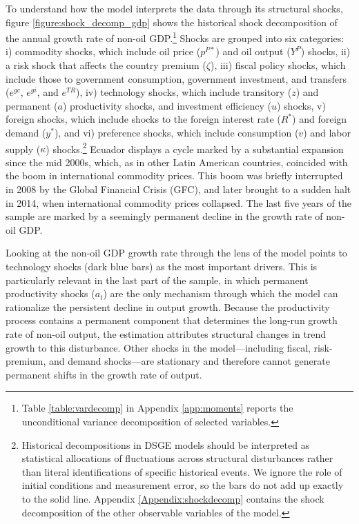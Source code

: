 \documentclass[12pt]{article}
\begin{document}
To understand how the model interprets the data through its structural shocks, figure \ref{figure:shock_decomp_gdp} shows the historical shock decomposition of the annual growth rate of non-oil GDP.\footnote{Table \ref{table:vardecomp} in Appendix \ref{app:moments} reports the unconditional variance decomposition of selected variables.} Shocks are grouped into six categories: i) commodity shocks, which include oil price ($p^{P*}$) and oil output ($Y^{P}$) shocks, ii) a risk shock that affects the country premium ($\zeta$), iii) fiscal policy shocks, which include those to government consumption, government investment, and transfers ($e^{gc}$, $e^{gi}$, and $e^{TR}$), iv) technology shocks, which include transitory ($z$) and permanent ($a$) productivity shocks, and investment efficiency ($u$) shocks, v) foreign shocks, which include shocks to the foreign interest rate ($R^*$) and foreign demand ($y^*$), and vi) preference shocks, which include consumption ($v$) and labor supply ($\kappa$) shocks.\footnote{Historical decompositions in DSGE models should be interpreted as statistical allocations of fluctuations across structural disturbances rather than literal identifications of specific historical events. We ignore the role of initial conditions and measurement error, so the bars do not add up exactly to the solid line. Appendix \ref{Appendix:shockdecomp} contains the shock decomposition of the other observable variables of the model.} Ecuador displays a cycle marked by a substantial expansion since the mid 2000s, which, as in other Latin American countries, coincided with the boom in international commodity prices. This boom was briefly interrupted in 2008 by the Global Financial Crisis (GFC), and later brought to a sudden halt in 2014, when international commodity prices collapsed. The last five years of the sample are marked by a seemingly permanent decline in the growth rate of non-oil GDP.

Looking at the non-oil GDP growth rate through the lens of the model points to technology shocks (dark blue bars) as the most important drivers. This is particularly relevant in the last part of the sample, in which permanent productivity shocks ($a_t$) are the only mechanism through which the model can rationalize the persistent decline in output growth. Because the productivity process contains a permanent component that determines the long-run growth rate of non-oil output, the estimation attributes structural changes in trend growth to this disturbance. Other shocks in the model---including fiscal, risk-premium, and demand shocks---are stationary and therefore cannot generate permanent shifts in the growth rate of output.
\end{document}
